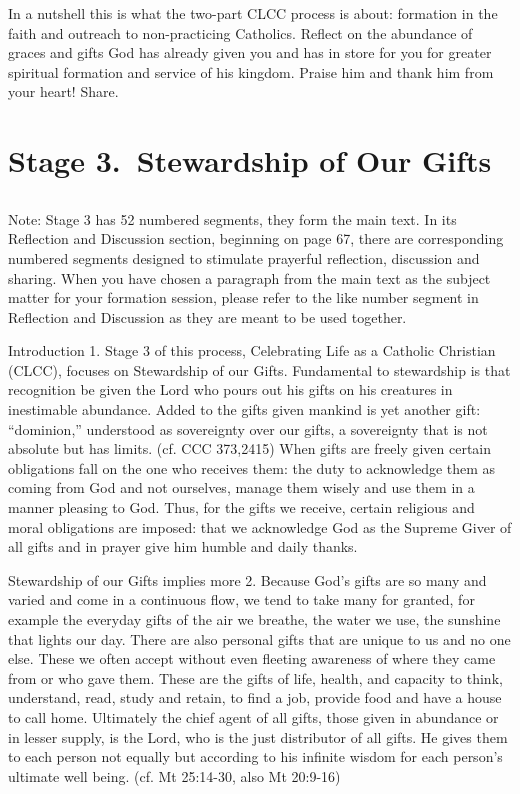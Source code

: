 \documentclass[oneside]{book}
\begin{document}
In a nutshell this is what the two-part CLCC process is about: formation in the
faith and outreach to non-practicing Catholics. Reflect on the abundance of
graces and gifts God has already given you and has in store for you for greater
spiritual formation and service of his kingdom. Praise him and thank him from
your heart! Share.


\chapter{Stage 3.\ Stewardship of Our Gifts}

\section*{} 

Note: Stage 3 has 52 numbered segments, they form the main text. In its
Reflection and Discussion section, beginning on page 67, there are corresponding
numbered segments designed to stimulate prayerful reflection, discussion and
sharing. When you have chosen a paragraph from the main text as the subject
matter for your formation session, please refer to the like number segment in
Reflection and Discussion as they are meant to be used together.

Introduction
1. Stage 3 of this process, Celebrating Life as a Catholic Christian (CLCC),
focuses on Stewardship of our Gifts. Fundamental to stewardship is that
recognition be given the Lord who pours out his gifts on his creatures in
inestimable abundance. Added to the gifts given mankind is yet another gift:
``dominion,'' understood as sovereignty over our gifts, a sovereignty that is
not absolute but has limits. (cf. CCC 373,2415)
When gifts are freely given certain obligations fall on the one who receives
them: the duty to acknowledge them as coming from God and not ourselves, manage
them wisely and use them in a manner pleasing to God. Thus, for the gifts we
receive, certain religious and moral obligations are imposed: that we
acknowledge God as the Supreme Giver of all gifts and in prayer give him humble
and daily thanks.

Stewardship of our Gifts implies more
2. Because God's gifts are so many and varied and come in a continuous flow, we
tend to take many for granted, for example the everyday gifts of the air we
breathe, the water we use, the sunshine that lights our day. There are also
personal gifts that are unique to us and no one else.
These we often accept without even fleeting awareness of where they came from or
who gave them. These are the gifts of life, health, and capacity to think,
understand, read, study and retain, to find a job, provide food and have a house
to call home. Ultimately the chief agent of all gifts, those given in abundance
or in lesser supply, is the Lord, who is the just distributor of all gifts. He
gives them to each person not equally but according to his infinite wisdom for
each person's ultimate well being. (cf. Mt 25:14-30, also Mt 20:9-16)
\end{document}
